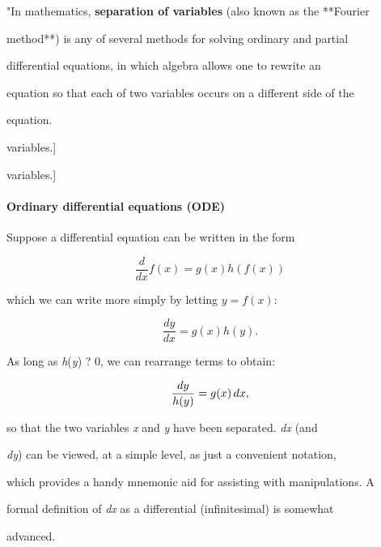 "In mathematics, \textbf{separation of variables} (also known as the **Fourier

method**) is any of several methods for solving ordinary and partial

differential equations, in which algebra allows one to rewrite an

equation so that each of two variables occurs on a different side of the

equation.




variables.]




variables.]



\paragraph{Ordinary differential equations (ODE)}



Suppose a differential equation can be written in the form



$$\frac{d}{dx} f(x) = g(x)h(f(x))$$



which we can write more simply by letting $y = f(x)$:



$$\frac{dy}{dx}=g(x)h(y).$$



As long as \textit{h}(\textit{y}) ? 0, we can rearrange terms to obtain:



$${dy \over h(y)} = g(x) \, dx,$$



so that the two variables \textit{x} and \textit{y} have been separated. \textit{dx} (and

\textit{dy}) can be viewed, at a simple level, as just a convenient notation,

which provides a handy mnemonic aid for assisting with manipulations. A

formal definition of \textit{dx} as a differential (infinitesimal) is somewhat

advanced.



